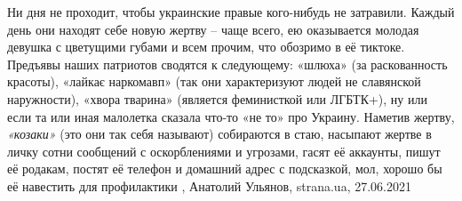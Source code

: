 Ни дня не проходит, чтобы украинские правые кого-нибудь не затравили. Каждый
день они находят себе новую жертву – чаще всего, ею оказывается молодая девушка
с цветущими губами и всем прочим, что обозримо в её тиктоке.  Предъявы наших
патриотов сводятся к следующему: «шлюха» (за раскованность красоты), «лайкає
наркомавп» (так они характеризуют людей не славянской наружности), «хвора
тварина» (является феминисткой или ЛГБТК+), ну или если та или иная малолетка
сказала что-то «не то» про Украину.  Наметив жертву, \emph{«козаки»} (это они так себя
называют) собираются в стаю, насыпают жертве в личку сотни сообщений с
оскорблениями и угрозами, гасят её аккаунты, пишут её родакам, постят её
телефон и домашний адрес с подсказкой, мол, хорошо бы её навестить для
профилактики
, 
Анатолий Ульянов, strana.ua, 27.06.2021

